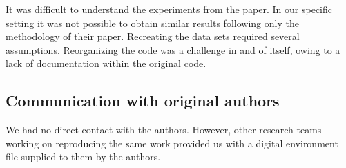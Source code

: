 It was difficult to understand the experiments from the paper. In our specific setting it was not possible to obtain similar results following only the methodology of their paper. Recreating the data sets required several assumptions. Reorganizing the code was a challenge in and of itself, owing to a lack of documentation within the original code.

\subsection*{Communication with original authors}
We had no direct contact with the authors. However, other research teams working on reproducing the same work provided us with a digital environment file supplied to them by the authors.






\clearpage


